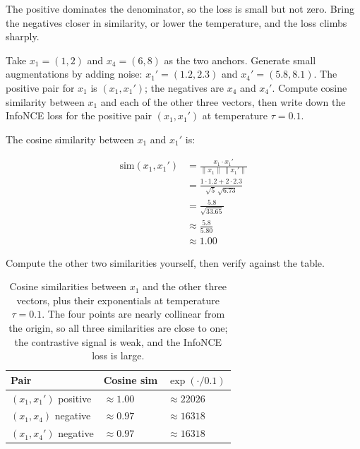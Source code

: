 The positive dominates the denominator, so the loss is small but not zero.
Bring the negatives closer in similarity, or lower the temperature, and the loss climbs sharply.


\vspace{2.5em}

Take $x_1 = (1,2)$ and $x_4 = (6,8)$ as the two anchors.
Generate small augmentations by adding noise: $x_1' = (1.2, 2.3)$ and $x_4' = (5.8, 8.1)$.
The positive pair for $x_1$ is $(x_1, x_1')$; the negatives are $x_4$ and $x_4'$.
Compute cosine similarity between $x_1$ and each of the other three vectors, then write down the InfoNCE loss for the positive pair $(x_1, x_1')$ at temperature $\tau = 0.1$.

The cosine similarity between $x_1$ and $x_1'$ is:

\begin{align*}
    \mathrm{sim}(x_1, x_1') &= \frac{x_1 \cdot x_1'}{\|x_1\|\,\|x_1'\|} \\
                             &= \frac{1 \cdot 1.2 + 2 \cdot 2.3}{\sqrt{5}\,\sqrt{6.73}} \\
                             &= \frac{5.8}{\sqrt{33.65}} \\
                             &\approx \frac{5.8}{5.80} \\
                             &\approx 1.00
\end{align*}

Compute the other two similarities yourself, then verify against the table.

\begin{table}[ht]
\centering
\begin{tabular}{p{}p{}p{}}
    \toprule
    \textbf{Pair} & \textbf{Cosine sim} & \textbf{$\exp(\cdot/0.1)$} \\
    \midrule
    $(x_1, x_1')$ positive & $\approx 1.00$ & $\approx 22026$ \\
    $(x_1, x_4)$ negative  & $\approx 0.97$ & $\approx 16318$ \\
    $(x_1, x_4')$ negative & $\approx 0.97$ & $\approx 16318$ \\
    \bottomrule
\end{tabular}
\vspace{2em}
\caption{Cosine similarities between $x_1$ and the other three vectors, plus their exponentials at temperature $\tau{=}0.1$. The four points are nearly collinear from the origin, so all three similarities are close to one; the contrastive signal is weak, and the InfoNCE loss is large.}
\label{tab:infonce_six_points}
\end{table}

